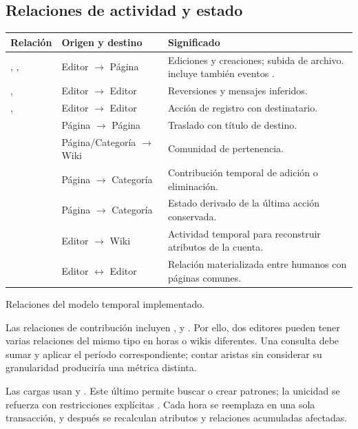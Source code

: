 \subsection{Relaciones de actividad y estado}
\begin{tabla}
\begin{tabularx}{\textwidth}{P{3.3cm}P{3.0cm}Y}
\toprule
Relación & Origen y destino & Significado \\
\midrule
{}, ,  & Editor $\to$ Página & Ediciones y creaciones; subida de archivo.  incluye también eventos . \\
,  & Editor $\to$ Editor & Reversiones y mensajes inferidos. \\
,  & Editor $\to$ Editor & Acción de registro con destinatario. \\
 & Página $\to$ Página & Traslado con título de destino. \\
 & Página/Categoría $\to$ Wiki & Comunidad de pertenencia. \\
 & Página $\to$ Categoría & Contribución temporal de adición o eliminación. \\
 & Página $\to$ Categoría & Estado derivado de la última acción conservada. \\
 & Editor $\to$ Wiki & Actividad temporal para reconstruir atributos de la cuenta. \\
 & Editor $\leftrightarrow$ Editor & Relación materializada entre humanos con páginas comunes. \\
\bottomrule
\end{tabularx}
\caption{Relaciones del modelo temporal implementado.}
\end{tabla}

Las relaciones de contribución incluyen ,  y . Por ello, dos editores pueden tener varias relaciones del mismo tipo en horas o wikis diferentes. Una consulta debe sumar  y aplicar el período correspondiente; contar aristas sin considerar su granularidad produciría una métrica distinta.

Las cargas usan  y . Este último permite buscar o crear patrones; la unicidad se refuerza con restricciones explícitas \cite{neo4j}. Cada hora se reemplaza en una sola transacción, y después se recalculan atributos y relaciones acumuladas afectadas.

